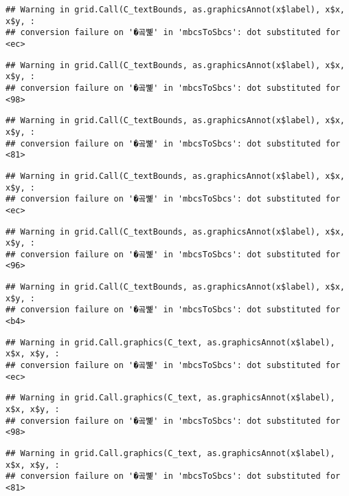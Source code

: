 \documentclass[
]{article}
\begin{document}
\begin{verbatim}
## Warning in grid.Call(C_textBounds, as.graphicsAnnot(x$label), x$x, x$y, :
## conversion failure on '�곸뼱' in 'mbcsToSbcs': dot substituted for <ec>
\end{verbatim}

\begin{verbatim}
## Warning in grid.Call(C_textBounds, as.graphicsAnnot(x$label), x$x, x$y, :
## conversion failure on '�곸뼱' in 'mbcsToSbcs': dot substituted for <98>
\end{verbatim}

\begin{verbatim}
## Warning in grid.Call(C_textBounds, as.graphicsAnnot(x$label), x$x, x$y, :
## conversion failure on '�곸뼱' in 'mbcsToSbcs': dot substituted for <81>
\end{verbatim}

\begin{verbatim}
## Warning in grid.Call(C_textBounds, as.graphicsAnnot(x$label), x$x, x$y, :
## conversion failure on '�곸뼱' in 'mbcsToSbcs': dot substituted for <ec>
\end{verbatim}

\begin{verbatim}
## Warning in grid.Call(C_textBounds, as.graphicsAnnot(x$label), x$x, x$y, :
## conversion failure on '�곸뼱' in 'mbcsToSbcs': dot substituted for <96>
\end{verbatim}

\begin{verbatim}
## Warning in grid.Call(C_textBounds, as.graphicsAnnot(x$label), x$x, x$y, :
## conversion failure on '�곸뼱' in 'mbcsToSbcs': dot substituted for <b4>
\end{verbatim}

\begin{verbatim}
## Warning in grid.Call.graphics(C_text, as.graphicsAnnot(x$label), x$x, x$y, :
## conversion failure on '�곸뼱' in 'mbcsToSbcs': dot substituted for <ec>
\end{verbatim}

\begin{verbatim}
## Warning in grid.Call.graphics(C_text, as.graphicsAnnot(x$label), x$x, x$y, :
## conversion failure on '�곸뼱' in 'mbcsToSbcs': dot substituted for <98>
\end{verbatim}

\begin{verbatim}
## Warning in grid.Call.graphics(C_text, as.graphicsAnnot(x$label), x$x, x$y, :
## conversion failure on '�곸뼱' in 'mbcsToSbcs': dot substituted for <81>
\end{verbatim}
\end{document}
